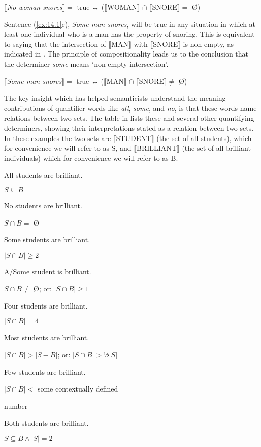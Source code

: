 \ea \label{ex:14.3}
{}$\llbracket$\textit{No woman snores}$\rrbracket =$ true ↔  ($\llbracket$WOMAN$\rrbracket$  ${\cap}$ $\llbracket$SNORE$\rrbracket =$ \O)
\z


Sentence (\ref{ex:14.1}c), \textit{Some man snores}, will be true in any situation in which at least one individual who is a man has the property of snoring. This is equivalent to saying that the intersection of $\llbracket$MAN$\rrbracket$  with $\llbracket$SNORE$\rrbracket$  is non-empty, as indicated in . The principle of compositionality leads us to the conclusion that the determiner \textit{some} means ‘non-empty intersection’.


\ea \label{ex:14.4}
{}$\llbracket$\textit{Some man snores}$\rrbracket =$ true ↔  ($\llbracket$MAN$\rrbracket$  ${\cap}$ $\llbracket$SNORE$\rrbracket \neq$ \O)
\z


The key insight which has helped semanticists understand the meaning contributions of quantifier words like \textit{all}, \textit{some}, and \textit{no}, is that these words name relations between two sets. The table in  lists these and several other quantifying determiners, showing their interpretations stated as a relation between two sets. In these examples the two sets are $\llbracket$STUDENT$\rrbracket$  (the set of all students), which for convenience we will refer to as S, and $\llbracket$BRILLIANT$\rrbracket$  (the set of all brilliant individuals) which for convenience we will refer to as B.

\ea \label{ex:14.5}
\ea  \parbox{4.5cm}{All students are brilliant.}\parbox{6cm}{$S \subseteq B$}
\ex   \parbox{4.5cm}{No students are brilliant.}\parbox{6cm}{$S  \cap {B} = $ \O}
\ex \parbox{4.5cm}{Some students are brilliant.}\parbox{6cm}{$|S \cap {B}{|} {\geq} 2$}
\ex \parbox{4.5cm}{A/Some student is brilliant.}\parbox{6cm}{$S  \cap B \neq $ \O; or:  $|S \cap B| \geq 1$}
\ex \parbox{4.5cm}{Four students are brilliant.}\parbox{6cm}{$|S \cap B | = 4$\footnotemark{}}
\ex \parbox{4.5cm}{Most students are brilliant.}\parbox{6cm}{$|S \cap B | > |S - B|$; or: $|S \cap B| > ½|S|$}
\ex  \parbox{4.5cm}{Few students are brilliant.}\parbox[t]{5.7cm}{$|S \cap B | <$ some contextually defined\\\rule{0pt}{0pt}\hfill number}
\ex \parbox{4.5cm}{Both students are brilliant.}\parbox{6cm}{$S  \subseteq B  \wedge |S| = 2$}
\z \z
{}

